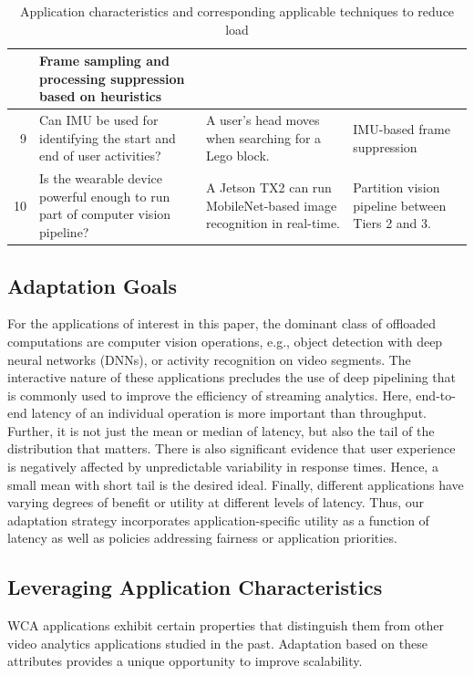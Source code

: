 \begin{table}[]
\begin{tabular}{|r|p{35ex}|p{43ex}|p{32ex}|}
        & Frame sampling and processing suppression based on heuristics   \\ \hline
    9&Can IMU be used for identifying the start and end of user activities?
        & A user's head moves when searching for a Lego block.
        & IMU-based frame suppression \\ \hline
    10&Is the wearable device powerful enough to run part of computer vision pipeline?
        & A Jetson TX2 can run MobileNet-based image recognition in real-time.
        & Partition vision pipeline between Tiers 2 and 3.    \\ \hline
    \end{tabular}
\vspace{0.1in}
    \caption{\small Application characteristics and corresponding applicable techniques to reduce load}
    \label{tab:questions-techniques}
\end{table}

\subsection{Adaptation Goals}
 
For the applications of interest in this paper, the dominant class of offloaded
computations are computer vision operations, e.g., object detection with deep
neural networks (DNNs), or activity recognition on video segments. The
interactive nature of these applications precludes the use of deep pipelining
that is commonly used to improve the efficiency of streaming analytics.  Here,
end-to-end latency of an individual operation is more important than
throughput. Further, it is not just the mean or median of latency, but also the
tail of the distribution that matters.  There is also significant evidence that
user experience is negatively affected by unpredictable variability in response
times. Hence, a small mean with short tail is the desired ideal. Finally,
different applications have varying degrees of benefit or utility at different
levels of latency.  Thus, our adaptation strategy incorporates
application-specific utility as a function of latency as well as policies
addressing fairness or application priorities.  


\subsection{Leveraging Application Characteristics}
\label{sec:workload-reduction}

WCA applications exhibit certain properties that distinguish them from
other video analytics applications studied in the past.  Adaptation
based on these attributes provides a unique opportunity to improve
scalability.

